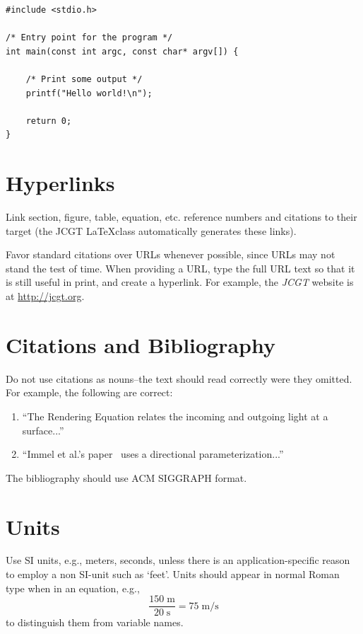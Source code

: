 \documentclass{jcgt}
\begin{document}
\begin{lstlisting}[caption={A simple C program.}, label={lst:hello}, float]
#include <stdio.h>

/* Entry point for the program */
int main(const int argc, const char* argv[]) {

    /* Print some output */
    printf("Hello world!\n");

    return 0;
}
\end{lstlisting}

\section{Hyperlinks}
Link section, figure, table, equation, etc. reference numbers and citations to their target (the JCGT \LaTeX class automatically generates these links).

Favor standard citations over URLs whenever possible, since URLs may not stand the test of time.  When providing a URL, type the full URL text so that it is still useful in print, and create a hyperlink.  For example,
the \textit{JCGT} website is at \href{http://jcgt.org}{http://jcgt.org}.

\section{Citations and Bibliography}
Do not use citations as nouns--the text should read correctly were they omitted. For example, the following are correct:

\begin{enumerate}
\item ``The Rendering Equation \cite{Immel:1986:RMN:15886.15901,Kajiya:1986:RE:15922.15902} relates the incoming and outgoing light at a surface...''
\item ``Immel et al.'s paper~ uses a directional parameterization...''
\end{enumerate}

\noindent The bibliography should use ACM SIGGRAPH format.

\section{Units}
Use SI units, e.g., meters, seconds, unless there is an application-specific reason to employ a non SI-unit such as `feet'.  Units should appear in normal Roman type when in an equation, e.g.,
%
\begin{equation}
\frac{150\;\mathrm{m}}{20\;\mathrm{s}} = 75\;\mathrm{m}/\mathrm{s}
\end{equation}
%
to distinguish them from variable names.
\end{document}
